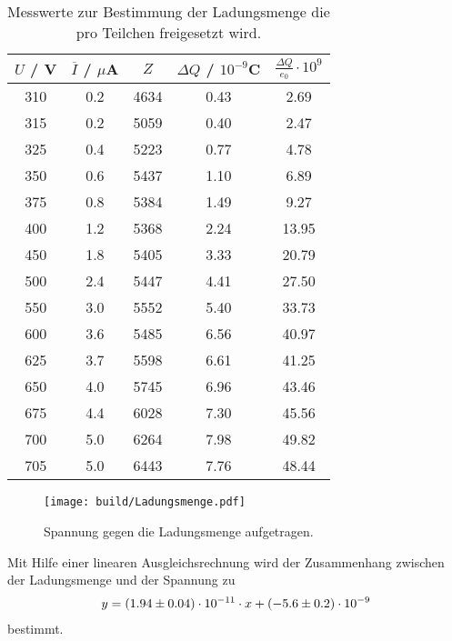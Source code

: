 \begin{table}[H]
  \centering
  \begin{tabular}{c|c|c|c|c}
    \hline
    $U$ / V & $\overline{I}$ / $\mu$A & $Z$ & $\Delta Q$ / $10^{-9}$C & $\frac{\Delta Q}{e_0}\cdot10^{9}$ \\
    \hline
    310 & 0.2 & 4634 & 0.43 &  2.69 \\
    315 & 0.2 & 5059 & 0.40 &  2.47 \\
    325 & 0.4 & 5223 & 0.77 &  4.78 \\
    350 & 0.6 & 5437 & 1.10 &  6.89 \\
    375 & 0.8 & 5384 & 1.49 &  9.27 \\
    400 & 1.2 & 5368 & 2.24 & 13.95 \\
    450 & 1.8 & 5405 & 3.33 & 20.79 \\
    500 & 2.4 & 5447 & 4.41 & 27.50 \\
    550 & 3.0 & 5552 & 5.40 & 33.73 \\
    600 & 3.6 & 5485 & 6.56 & 40.97 \\
    625 & 3.7 & 5598 & 6.61 & 41.25 \\
    650 & 4.0 & 5745 & 6.96 & 43.46 \\
    675 & 4.4 & 6028 & 7.30 & 45.56 \\
    700 & 5.0 & 6264 & 7.98 & 49.82 \\
    705 & 5.0 & 6443 & 7.76 & 48.44 \\
  \end{tabular}
  \caption{Messwerte zur Bestimmung der Ladungsmenge die pro Teilchen freigesetzt wird.}
  \label{tab:Ladungsmenge}
\end{table}

\begin{figure}[H]
  \centering
  \texttt{[image: build/Ladungsmenge.pdf]}
  \caption{Spannung gegen die Ladungsmenge aufgetragen.}
  \label{fig:Ladungsmenge1}
\end{figure}

Mit Hilfe einer linearen Ausgleichsrechnung wird der Zusammenhang zwischen der Ladungsmenge und der Spannung zu
\begin{align*}
  y = (\num{1.94 +- 0.04}) \cdot 10^{-11} \cdot x + (\num{-5.6 +- 0.2}) \cdot 10^{-9}
\end{align*}
bestimmt.
